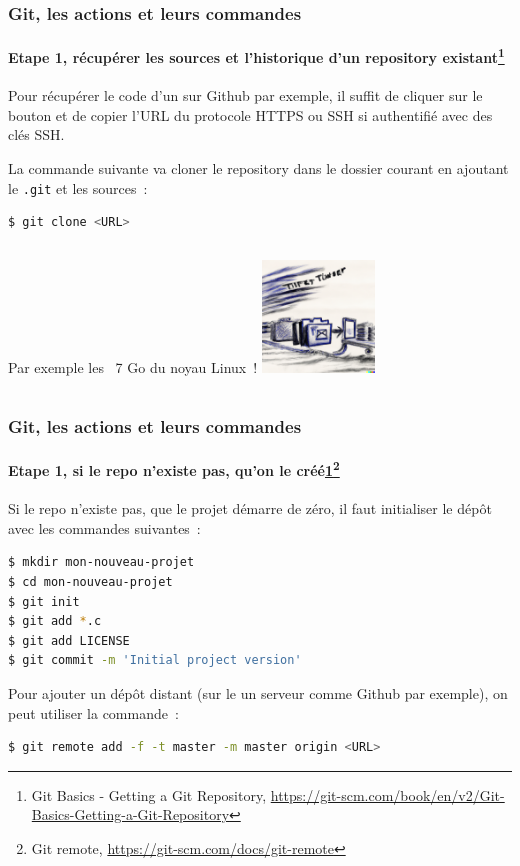\documentclass{beamer}
\begin{document}
    \begin{frame}[fragile]
        \frametitle{Git, les actions et leurs commandes}
        \framesubtitle{Etape 1, récupérer les sources et l'historique d'un repository existant\footnote{\label{progitgetrepo}Git Basics - Getting a Git Repository, \url{https://git-scm.com/book/en/v2/Git-Basics-Getting-a-Git-Repository}}}
        \transdissolve
        Pour récupérer le code d'un sur Github par exemple, il suffit de cliquer sur le bouton  et de copier l'URL du protocole HTTPS ou SSH si authentifié avec des clés SSH.

        La commande suivante va cloner le repository dans le dossier courant en ajoutant le \lstinline{.git} et les sources~:
        \begin{lstlisting}[language=sh]
$ git clone <URL>
        \end{lstlisting}
        \begin{columns}
            Par exemple les ~7 Go du noyau Linux~!
            \centering
            \includegraphics[width=3cm]{image/git-clone-artwork.png}
        \end{columns}
    \end{frame}

    \begin{frame}[fragile]
        \frametitle{Git, les actions et leurs commandes}
        \framesubtitle{Etape 1, si le repo n'existe pas, qu'on le créé\cref{progitgetrepo}\footnote{Git remote, \url{https://git-scm.com/docs/git-remote}}}
        \transdissolve
        Si le repo n'existe pas, que le projet démarre de zéro, il faut initialiser le dépôt avec les commandes suivantes~:
        \begin{lstlisting}[language=sh]
$ mkdir mon-nouveau-projet
$ cd mon-nouveau-projet
$ git init
$ git add *.c
$ git add LICENSE
$ git commit -m 'Initial project version'
        \end{lstlisting}

        Pour ajouter un dépôt distant (sur le un serveur comme Github par exemple), on peut utiliser la commande~:
        \begin{lstlisting}[language=sh]
$ git remote add -f -t master -m master origin <URL>
        \end{lstlisting}
    \end{frame}
\end{document}
